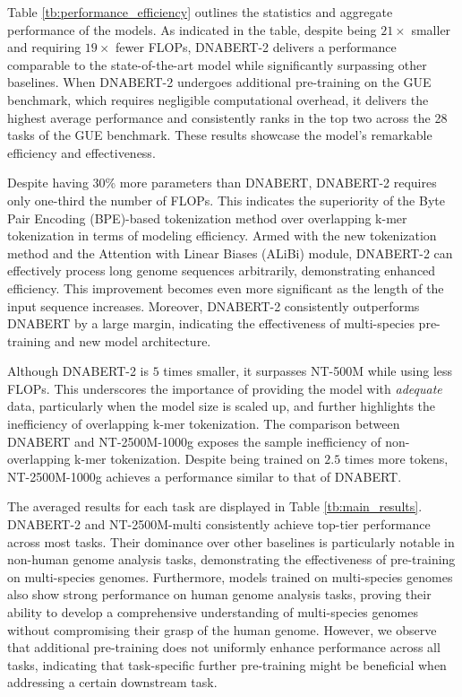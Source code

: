 \documentclass{article}
\begin{document}
Table \ref{tb:performance_efficiency} outlines the statistics and aggregate performance of the models. As indicated in the table, despite being $21 \times$ smaller and requiring $19 \times$ fewer FLOPs, DNABERT-2 delivers a performance comparable to the state-of-the-art model while significantly surpassing other baselines. When DNABERT-2 undergoes additional pre-training on the GUE benchmark, which requires negligible computational overhead, it delivers the highest average performance and consistently ranks in the top two across the 28 tasks of the GUE benchmark. These results showcase the model's remarkable efficiency and effectiveness.

Despite having 30\% more parameters than DNABERT, DNABERT-2 requires only one-third the number of FLOPs. This indicates the superiority of the Byte Pair Encoding (BPE)-based tokenization method over overlapping k-mer tokenization in terms of modeling efficiency. Armed with the new tokenization method and the Attention with Linear Biases (ALiBi) module, DNABERT-2 can effectively process long genome sequences arbitrarily, demonstrating enhanced efficiency. This improvement becomes even more significant as the length of the input sequence increases. Moreover, DNABERT-2 consistently outperforms DNABERT by a large margin, indicating the effectiveness of multi-species pre-training and new model architecture.


Although DNABERT-2 is $5$ times smaller, it surpasses NT-500M while using less FLOPs. This underscores the importance of providing the model with \textit{adequate} data, particularly when the model size is scaled up, and further highlights the inefficiency of overlapping k-mer tokenization. The comparison between DNABERT and NT-2500M-1000g exposes the sample inefficiency of non-overlapping k-mer tokenization. Despite being trained on $2.5$ times more tokens, NT-2500M-1000g achieves a performance similar to that of DNABERT.

The averaged results for each task are displayed in Table \ref{tb:main_results}. DNABERT-2 and NT-2500M-multi consistently achieve top-tier performance across most tasks. Their dominance over other baselines is particularly notable in non-human genome analysis tasks, demonstrating the effectiveness of pre-training on multi-species genomes. Furthermore, models trained on multi-species genomes also show strong performance on human genome analysis tasks, proving their ability to develop a comprehensive understanding of multi-species genomes without compromising their grasp of the human genome. However, we observe that additional pre-training does not uniformly enhance performance across all tasks, indicating that task-specific further pre-training might be beneficial when addressing a certain downstream task.
\end{document}
